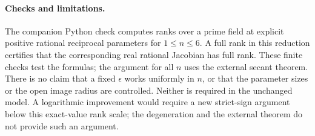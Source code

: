 \documentclass[11pt]{article}
\begin{document}
\paragraph{Checks and limitations.}
The companion Python check computes ranks over a prime field at
explicit positive rational reciprocal parameters for $1\leq n\leq6$.
A full rank in this reduction certifies that the corresponding
real rational Jacobian has full rank. These finite checks test the
formulas; the argument for all $n$ uses the external secant theorem.
There is no claim that a fixed $\epsilon$ works uniformly in $n$,
or that the parameter sizes or the open image radius are controlled.
Neither is required in the unchanged model. A logarithmic improvement
would require a new strict-sign argument below this exact-value
rank scale; the degeneration and the external theorem do not provide
such an argument.
\end{document}
